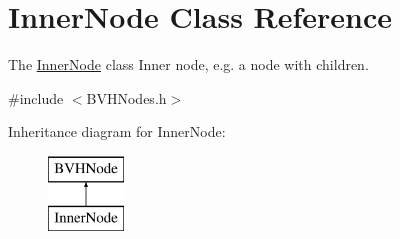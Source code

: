 \hypertarget{classInnerNode}{\section{Inner\-Node Class Reference}
\label{classInnerNode}
}


The \hyperlink{classInnerNode}{Inner\-Node} class Inner node, e.\-g. a node with children.  




{\ttfamily \#include $<$B\-V\-H\-Nodes.\-h$>$}

Inheritance diagram for Inner\-Node\-:\begin{figure}[H]
\begin{center}
\leavevmode
\includegraphics[height=2.000000cm]{classInnerNode}
\end{center}
\end{figure}
